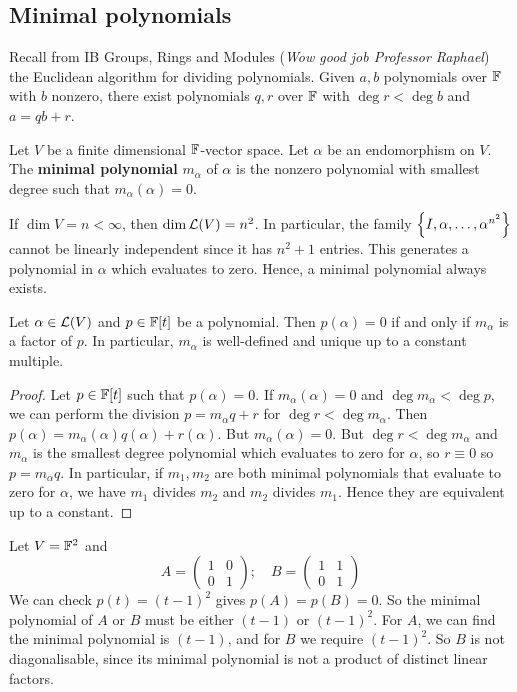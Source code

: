 \documentclass[a4paper]{article}
\begin{document}
\subsection{Minimal polynomials}
{\color{blue}Recall from IB Groups, Rings and Modules} (\textit{Wow good job Professor Raphael}) the Euclidean algorithm for dividing polynomials.
Given $ a, b $ polynomials over $ {\mathbb{F}} $ with $ b $ nonzero, there exist polynomials $ q, r $ over $ {\mathbb{F}} $ with $ \deg r < \deg b $ and $ a = qb + r $.
\begin{definition}
	Let $ V $ be a finite dimensional $ {\mathbb{F}} $-vector space.
	Let $ \alpha $ be an endomorphism on $ V $.
	The \textbf{minimal polynomial} $ m_\alpha $ of $ \alpha $ is the nonzero polynomial with smallest degree such that $ m_\alpha(\alpha) = 0 $.
\end{definition}
\begin{remark}
	If $ \dim V = n < \infty $, then $ \dim {\mathcal{L}}(V) = n^2 $.
	In particular, the family $ \qty{I, \alpha, \dots, \alpha^{n^2}} $ cannot be linearly independent since it has $ n^2+1 $ entries.
	This generates a polynomial in $ \alpha $ which evaluates to zero.
	Hence, a minimal polynomial always exists.
\end{remark}
\begin{lemma}
	Let $ \alpha \in {\mathcal{L}}(V) $ and $ p \in {\mathbb{F}}[t] $ be a polynomial.
	Then $ p(\alpha) = 0 $ if and only if $ m_\alpha $ is a factor of $ p $.
	In particular, $ m_\alpha $ is well-defined and unique up to a constant multiple.
\end{lemma}
\begin{proof}
	Let $ p \in {\mathbb{F}}[t] $ such that $ p(\alpha) = 0 $.
	If $ m_\alpha(\alpha) = 0 $ and $ \deg m_\alpha < \deg p $, we can perform the division $ p = m_\alpha q + r $ for $ \deg r < \deg m_\alpha $.
	Then $ p(\alpha) = m_\alpha(\alpha) q(\alpha) + r(\alpha) $.
	But $ m_\alpha(\alpha) = 0 $.
	But $ \deg r < \deg m_\alpha $ and $ m_\alpha $ is the smallest degree polynomial which evaluates to zero for $ \alpha $, so $ r \equiv 0 $ so $ p = m_\alpha q $.
	In particular, if $ m_1, m_2 $ are both minimal polynomials that evaluate to zero for $ \alpha $, we have $ m_1 $ divides $ m_2 $ and $ m_2 $ divides $ m_1 $.
	Hence they are equivalent up to a constant.
\end{proof}
\begin{example}
	Let $ V = {\mathbb{F}}^2 $ and
	\[
		A= \begin{pmatrix}
			1 & 0 \\
			0 & 1
		\end{pmatrix};\quad B = \begin{pmatrix}
			1 & 1 \\
			0 & 1
		\end{pmatrix}
	\]
	We can check $ p(t) = (t-1)^2 $ gives $ p(A) = p(B) = 0 $.
	So the minimal polynomial of $ A $ or $ B $ must be either $ (t-1) $ or $ (t-1)^2 $.
	For $ A $, we can find the minimal polynomial is $ (t-1) $, and for $ B $ we require $ (t-1)^2 $.
	So $ B $ is not diagonalisable, since its minimal polynomial is not a product of distinct linear factors.
\end{example}
\end{document}

